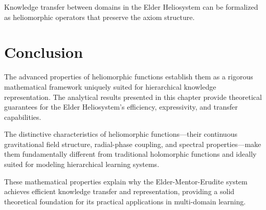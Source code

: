 \begin{corollary}
Knowledge transfer between domains in the Elder Heliosystem can be formalized as heliomorphic operators that preserve the axiom structure.
\end{corollary}

\section{Conclusion}

The advanced properties of heliomorphic functions establish them as a rigorous mathematical framework uniquely suited for hierarchical knowledge representation. The analytical results presented in this chapter provide theoretical guarantees for the Elder Heliosystem's efficiency, expressivity, and transfer capabilities.

The distinctive characteristics of heliomorphic functions—their continuous gravitational field structure, radial-phase coupling, and spectral properties—make them fundamentally different from traditional holomorphic functions and ideally suited for modeling hierarchical learning systems.

These mathematical properties explain why the Elder-Mentor-Erudite system achieves efficient knowledge transfer and representation, providing a solid theoretical foundation for its practical applications in multi-domain learning.